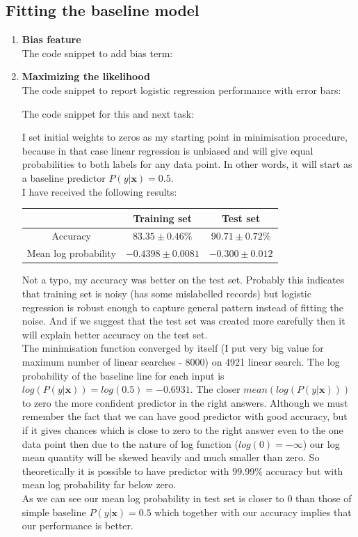 \documentclass{article}
\newcommand{\vect}[1]{\boldsymbol{#1}} %
\begin{document}
			\subsection{Fitting the baseline model}
				\begin{enumerate}[label=(\alph*)]
					\item
						\textbf{Bias feature} \\
						The code snippet to add bias term:
						
					\item
						\textbf{ Maximizing the likelihood} \\
						The code snippet to report logistic regression performance with error bars:
						
						The code snippet for this and next task:
						
						I set initial weights to zeros as my starting point in minimisation procedure, because in that case linear regression is unbiased and will give equal probabilities to both labels for any data point. In other words,  it will start as a baseline predictor $P(y | \vect{x}) = 0.5$.\\
						I have received the following results:
						\begin{center}
							\begin{tabular}{| c | c | c |}
								\hline
								\, &  Training set & Test set \\ 
								\hline
								Accuracy                  & $83.35 \pm 0.46 \%$ & $90.71 \pm 0.72 \%$ \\ 
								\hline
								Mean log probability &$-0.4398 \pm 0.0081$ & $-0.300 \pm 0.012 $ \\
								\hline
							\end{tabular}
						\end{center}
						Not a typo, my accuracy was better on the test set. Probably this indicates that training set is noisy (has some mislabelled records) but logistic regression is robust enough to capture general pattern instead of fitting the noise. And if we suggest that the test set was created more carefully then it will explain better accuracy on the test set.
						\\
						The minimisation function converged by itself (I put very big value for maximum number of linear searches - 8000) on 4921 linear search.  The log probability of the baseline line for each input is $log(P(y | \vect{x})) = log(0.5) = -0.6931$. The closer $mean(log(P(y|\vect{x})))$ to zero the more confident predictor in the right answers. Although we must remember the fact that we can have good predictor with good accuracy, but if it gives chances which is close to zero to the right answer even to the one data point then due to the nature of log function ($log(0)= -\infty$) our log mean quantity will be skewed heavily and much smaller than zero. So theoretically it is possible to have predictor with 99.99\% accuracy but with mean log probability far below zero.
						\\
						As we can see our mean log probability in  test set is closer to 0 than those of simple baseline $P(y | \vect{x})=0.5$ which together with our accuracy  implies that our performance is better.
						

\end{enumerate}
\end{document}
